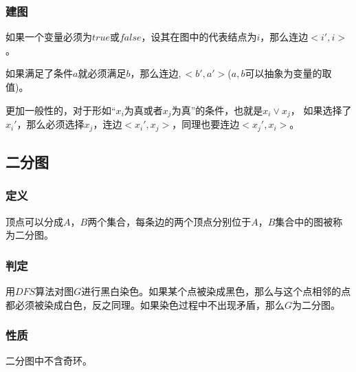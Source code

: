 \documentclass[11pt]{article}
\begin{document}
\subsubsection{建图}
\label{sec-2-3-2}

如果一个变量必须为\(true\)或\(false\)，设其在图中的代表结点为\(i\)，那么连边\(<i',i>\)。

如果满足了条件\(a\)就必须满足\(b\)，那么连边\(<a,b>,<b',a'>\)(\(a,b\)可以抽象为变量的取值)。

更加一般性的，对于形如“\(x_i\)为真或者\(x_j\)为真”的条件，也就是\(x_i \vee x_j\)， 如果选择了\(x_i'\)，那么必须选择\(x_j\)，连边\(<x_i',x_j>\)，同理也要连边\(<x_j',x_i>\)。
\subsection{二分图}
\label{sec-2-4}
\subsubsection{定义}
\label{sec-2-4-1}

顶点可以分成\(A\)，\(B\)两个集合，每条边的两个顶点分别位于\(A\)，\(B\)集合中的图被称为二分图。

\subsubsection{判定}
\label{sec-2-4-2}

用\(DFS\)算法对图\(G\)进行黑白染色。如果某个点被染成黑色，那么与这个点相邻的点都必须被染成白色，反之同理。如果染色过程中不出现矛盾，那么\(G\)为二分图。

\subsubsection{性质}
\label{sec-2-4-3}

二分图中不含奇环。
\end{document}
